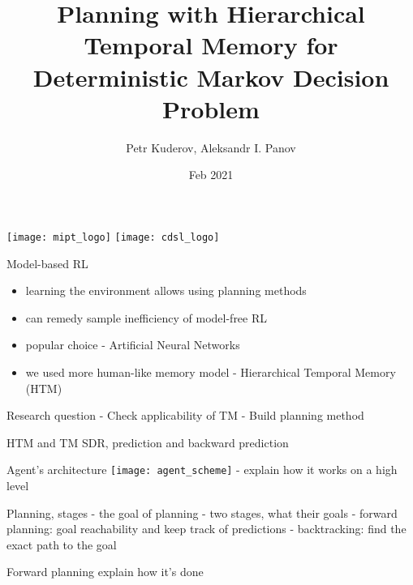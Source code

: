 \documentclass[default]{beamer}
\begin{document}
\title[]{
	Planning with Hierarchical Temporal Memory for Deterministic Markov Decision Problem
}
\author[Petr Kuderov]{
    Petr Kuderov, Aleksandr I. Panov
}
\date[]{Feb 2021}
	
\begin{frame}
	\titlepage
	\centering
	\texttt{[image: mipt\_logo]} \hspace{10pt}
	\texttt{[image: cdsl\_logo]} \hspace{10pt}
\end{frame}

\begin{frame}{Model-based RL}
	\begin{itemize}
		\item learning the environment allows using planning methods
		\item can remedy sample inefficiency of model-free RL
		\item popular choice - Artificial Neural Networks
		\item we used more human-like memory model - Hierarchical Temporal Memory (HTM)
	\end{itemize}
\end{frame}

\begin{frame}{Research question}
	- Check applicability of TM
  - Build planning method
\end{frame}

\begin{frame}{HTM and TM}
	SDR, prediction and backward prediction	
\end{frame}

\begin{frame}{Agent's architecture}
    \texttt{[image: agent\_scheme]}
	- explain how it works on a high level	
\end{frame}

\begin{frame}{Planning, stages}
	- the goal of planning
	- two stages, what their goals
	- forward planning: goal reachability and keep track of predictions
	- backtracking: find the exact path to the goal
\end{frame}

\begin{frame}{Forward planning}
	explain how it's done
\end{frame}
\end{document}
